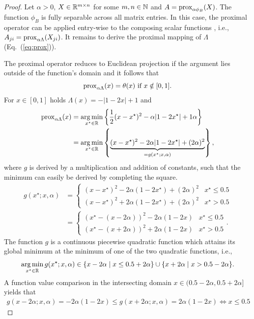 \begin{proof}
Let $\alpha>0$, $X\in\mathbb{R}^{m\times n}$ for some $m,n\in\mathbb{N}$ and $A=\operatorname{prox}_{\alpha\phi_B}(X)$. The function $\phi_B$ is fully separable across all matrix entries. In this case, the proximal operator can be applied entry-wise to the composing scalar functions \citep{parikh2014proximal}, i.e., $A_{ji}=\operatorname{prox}_{\alpha\Lambda}(X_{ji})$. It remains to derive the proximal mapping of $\Lambda$ (Eq.~(\ref{eq:prox})).

The proximal operator reduces to Euclidean projection if the argument lies outside of the function's domain \citep{parikh2014proximal} and it follows that
\[\operatorname{prox}_{\alpha\Lambda}(x)=\theta(x) \text{ if } x\notin[0,1].\]
For $x\in[0,1]$ holds $\Lambda(x)=-|1-2x|+1$ and
\begin{align*}
  \operatorname{prox}_{\alpha\Lambda}(x) &= \operatorname*{arg\,min}_{x^\star\in\mathbb{R}} \left\{\frac{1}{2}(x-x^\star)^2-\alpha|1-2x^\star| +1\alpha\right\}\\
  &= \operatorname*{arg\,min}_{x^\star\in\mathbb{R}} \left\{\underbrace{(x-x^\star)^2-2\alpha|1-2x^\star| +(2\alpha)^2}_{=g(x^\star;x,\alpha)}\right\},
\end{align*}
where $g$ is derived by a multiplication and addition of constants, such that the minimum can easily be derived by completing the square.
\begin{align*}
  g(x^\star;x,\alpha) &=\begin{cases}
    (x-x^\star)^2  -2\alpha(1-2 x^\star) +(2\alpha)^2 & x^\star \leq 0.5\\
    (x-x^\star)^2 +2\alpha(1-2 x^\star) +(2\alpha)^2 & x^\star> 0.5
  \end{cases}\\
  &=
  \begin{cases}
    (x^\star-(x-2\alpha))^2 -2\alpha( 1-2x)& x^\star \leq 0.5\\
    (x^\star-(x+2\alpha))^2 +2\alpha( 1-2x) & x^\star> 0.5
  \end{cases}.
\end{align*}
The function $g$ is a continuous piecewise quadratic function which attains its global minimum at the minimum of one of the two quadratic functions, i.e.,
\[
  \operatorname*{arg\,min}_{x^\star\in\mathbb{R}}g(x^\star;x,\alpha) \in \{x-2\alpha\mid x\leq 0.5+2\alpha\}\cup \{x+2\alpha\mid x> 0.5-2\alpha\}.
\] 
A function value comparison in the intersecting domain $x\in(0.5-2\alpha,0.5+2\alpha]$ yields that
\begin{align*}
g(x-2\alpha;x,\alpha)=-2\alpha(1-2x)\leq g(x+2\alpha;x,\alpha) =2\alpha(1-2x) \Leftrightarrow x\leq 0.5
\end{align*}
\end{proof}
